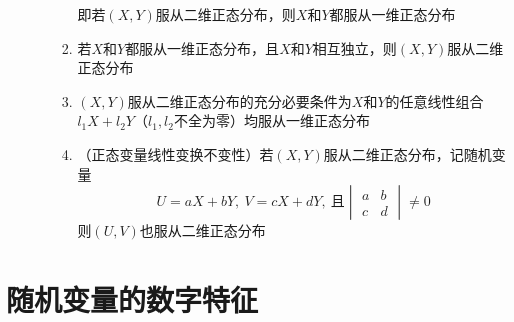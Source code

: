 \documentclass[12pt,a4paper,UTF8]{book}
\begin{document}
\begin{enumerate}
\begin{enumerate}
\begin{enumerate}
即若$\left(X,Y\right)$服从二维正态分布，则$X$和$Y$都服从一维正态分布
\item 若$X$和$Y$都服从一维正态分布，且$X$和$Y$相互独立，则$\left(X,Y\right)$服从二维正态分布
\item $\left(X,Y\right)$服从二维正态分布的充分必要条件为$X$和$Y$的任意线性组合$l_1X+l_2Y$（$l_1,l_2$不全为零）均服从一维正态分布
\item （正态变量线性变换不变性）若$\left(X,Y\right)$服从二维正态分布，记随机变量
\[U=aX+bY,\ V=cX+dY,\ \text{且}\begin{vmatrix}a&b\\c&d\end{vmatrix}\neq0\]
则$\left(U,V\right)$也服从二维正态分布
\end{enumerate}
\end{enumerate}
\end{enumerate}


\section{随机变量的数字特征}
\end{document}
